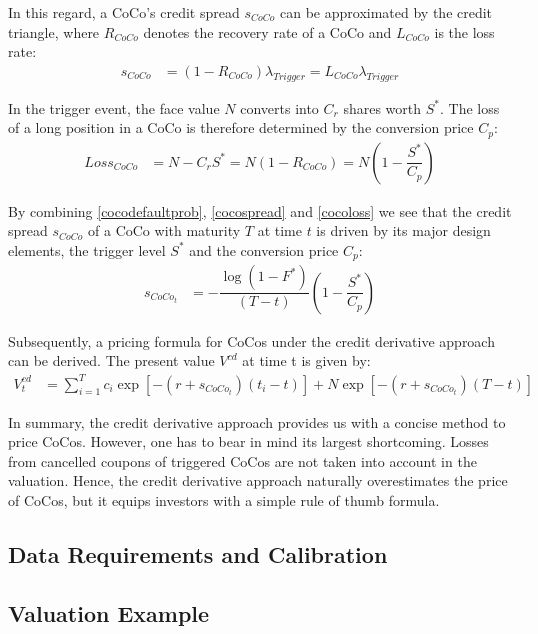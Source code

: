 In this regard, a CoCo's credit spread $s_{CoCo}$ can be approximated by the credit triangle, where $R_{CoCo}$ denotes the recovery rate of a CoCo and $L_{CoCo}$ is the loss rate:
\begin{align} \label{cocospread}
    s_{CoCo} &= \left(1 - R_{CoCo}\right) \lambda_{Trigger} = {L}_{CoCo} \lambda_{Trigger}
\end{align}

In the trigger event, the face value $N$ converts into $C_r$ shares worth $S^*$. The loss of a long position in a CoCo is therefore determined by the conversion price $C_p$:
\begin{align} \label{cocoloss}
    {Loss}_{CoCo} &= N - C_r S^* = N \left(1 - R_{CoCo} \right) = N \left(1 - \dfrac{S^*}{C_p} \right)
\end{align} 

By combining \ref{cocodefaultprob}, \ref{cocospread} and \ref{cocoloss} we see that the credit spread $s_{CoCo}$ of a CoCo with maturity $T$ at time $t$ is driven by its major design elements, the trigger level $S^*$ and the conversion price $C_p$:
\begin{align}
s_{CoCo_t}&= - \dfrac{\log (1 - F^*)}{(T - t)} \left( 1 - \dfrac{S^*}{C_p} \right)
\end{align}

Subsequently, a pricing formula for CoCos under the credit derivative approach can be derived. The present value $V^{cd}$ at time t is given by:
\begin{align}
V^{cd}_t &= \sum^T_{i=1} c_i \exp\left[-(r + s_{CoCo_t}) (t_i - t)\right] + N \exp\left[-(r+s_{CoCo_t}) (T-t) \right]
\end{align}

In summary, the credit derivative approach provides us with a concise method to price CoCos. However, one has to bear in mind its largest shortcoming. Losses from cancelled coupons of triggered CoCos are not taken into account in the valuation. Hence, the credit derivative approach naturally overestimates the price of CoCos, but it equips investors with a simple rule of thumb formula. 

\subsection{Data Requirements and Calibration}

\subsection{Valuation Example}

